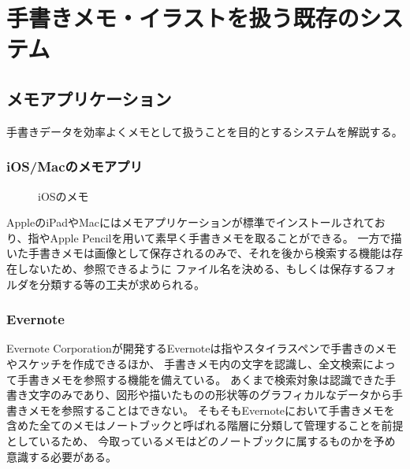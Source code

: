 \section{手書きメモ・イラストを扱う既存のシステム}

\subsection{メモアプリケーション}
手書きデータを効率よくメモとして扱うことを目的とするシステムを解説する。

\subsubsection{iOS/Macのメモアプリ}

\begin{figure}[htbp]
    \begin{center}
         \end{center}
    \caption{iOSのメモ}
\end{figure}

AppleのiPadやMacにはメモアプリケーションが標準でインストールされており、指やApple Pencilを用いて素早く手書きメモを取ることができる。
一方で描いた手書きメモは画像として保存されるのみで、それを後から検索する機能は存在しないため、参照できるように
ファイル名を決める、もしくは保存するフォルダを分類する等の工夫が求められる。

\subsubsection{Evernote}

Evernote Corporationが開発するEvernoteは指やスタイラスペンで手書きのメモやスケッチを作成できるほか、
手書きメモ内の文字を認識し、全文検索によって手書きメモを参照する機能を備えている。
あくまで検索対象は認識できた手書き文字のみであり、図形や描いたものの形状等のグラフィカルなデータから手書きメモを参照することはできない。
そもそもEvernoteにおいて手書きメモを含めた全てのメモはノートブックと呼ばれる階層に分類して管理することを前提としているため、
今取っているメモはどのノートブックに属するものかを予め意識する必要がある。

